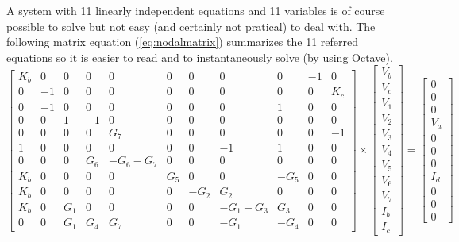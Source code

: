 A system with 11 linearly independent equations and 11 variables is of course possible to solve but not easy (and certainly not pratical) to deal with. The following matrix equation (\ref{eq:nodalmatrix}) summarizes the 11 referred equations so it is easier to read and to instantaneously solve (by using Octave).
\begin{equation}
\left[ \begin{array}{ccccccccccc} 
		K_b & 0 & 0 & 0 & 0 & 0 & 0 & 0 & 0 & -1 & 0 \\ 
		0 & -1 & 0 & 0 & 0 & 0 & 0 & 0 & 0 & 0 & K_c \\
		0 & -1 & 0 & 0 & 0 & 0 & 0 & 0 & 1 & 0 & 0 \\ 
		0 & 0 & 1 & -1 & 0 & 0 & 0 & 0 & 0 & 0 & 0 \\ 
		0 & 0 & 0 & 0 & G_7 & 0 & 0 & 0 & 0 & 0 & -1 \\ 
		1 & 0 & 0 & 0 & 0 & 0 & 0 & -1 & 1 & 0 & 0 \\ 
		0 & 0 & 0 & G_6 & -G_6 - G_7 & 0 & 0 & 0 & 0 & 0 & 0 \\ 
		K_b & 0 & 0 & 0 & 0 & G_5 & 0 & 0 & -G_5 & 0 & 0 \\ 
		K_b & 0 & 0 & 0 & 0 & 0 & -G_2 & G_2 & 0 & 0 & 0 \\ 
		K_b & 0 & G_1 & 0 & 0 & 0 & 0 & -G_1 - G_3 & G_3 & 0 & 0 \\ 
		0 & 0 & G_1 & G_4 & G_7 & 0 & 0 & -G_1 & -G_4 & 0 & 0 
\end{array} \right]
\times \left[ \begin{array}{c} V_b \\ V_c \\ V_1 \\ V_2 \\ V_3 \\ V_4 \\ V_5 \\ V_6 \\ V_7 \\ I_b \\ I_c \end{array} \right] =
\left[ \begin{array}{c} 0 \\ 0 \\ 0 \\ V_a \\ 0 \\ 0 \\ 0 \\ I_d \\ 0 \\ 0 \\ 0 \end{array} \right]
\label{eq:nodalmatrix}
\end{equation}

